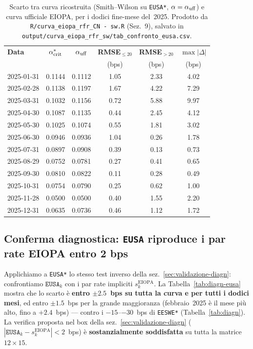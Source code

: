 \documentclass[11pt,a4paper]{article}
\theoremstyle{plain}
\theoremstyle{definition}
\theoremstyle{remark}
\begin{document}
\begin{table}[H]
\centering\small
\caption{Scarto tra curva ricostruita (Smith--Wilson su \texttt{EUSA*},
$\alpha = \alpha_{\rm uff}$) e curva ufficiale EIOPA, per i dodici fine-mese del~2025.
Prodotto da \texttt{R/curva\_eiopa\_rfr\_CN\ -\ sw.R} (Sez.~9), salvato in
\texttt{output/curva\_eiopa\_rfr\_sw/tab\_confronto\_eusa.csv}.}
\label{tab:rmse-eusa}
\renewcommand{\arraystretch}{1.2}
\begin{tabular}{lccccc}
\toprule
\textbf{Data} & $\alpha^*_{\rm crit}$ & $\alpha_{\rm uff}$ &
\textbf{RMSE}$_{\le 20}$ & \textbf{RMSE}$_{>20}$ & $\max|\Delta|$\\
 & & & (bps) & (bps) & (bps)\\
\midrule
\rowcolor{rowtint}2025-01-31 & 0.1144 & 0.1112 & 1.05 & 2.33 & 4.02\\
2025-02-28 & 0.1138 & 0.1197 & 1.67 & 4.22 & 7.29\\
\rowcolor{rowtint}2025-03-31 & 0.1032 & 0.1156 & 0.72 & 5.88 & 9.97\\
2025-04-30 & 0.1087 & 0.1135 & 0.44 & 2.45 & 4.12\\
\rowcolor{rowtint}2025-05-30 & 0.1025 & 0.1074 & 0.55 & 1.81 & 3.02\\
2025-06-30 & 0.0946 & 0.0936 & 1.04 & 0.26 & 1.78\\
\rowcolor{rowtint}2025-07-31 & 0.0897 & 0.0908 & 0.39 & 0.13 & 0.73\\
2025-08-29 & 0.0752 & 0.0781 & 0.27 & 0.41 & 0.65\\
\rowcolor{rowtint}2025-09-30 & 0.0810 & 0.0822 & 0.11 & 0.28 & 0.49\\
2025-10-31 & 0.0754 & 0.0790 & 0.25 & 0.62 & 1.00\\
\rowcolor{rowtint}2025-11-28 & 0.0500 & 0.0500 & 0.40 & 1.55 & 2.20\\
2025-12-31 & 0.0635 & 0.0736 & 0.46 & 1.12 & 1.72\\
\bottomrule
\end{tabular}
\end{table}

\subsection{Conferma diagnostica: \texttt{EUSA} riproduce i par rate EIOPA entro 2 bps}

Applichiamo a \texttt{EUSA*} lo stesso test inverso della sez.~\ref{sec:validazione-diagn}:
confrontiamo $\texttt{EUSA}_k$ con i par rate impliciti $s_k^{\text{EIOPA}}$. La
Tabella~\ref{tab:diagn-eusa} mostra che lo scarto \`e \textbf{entro $\pm 2.5$~bps su tutta
la curva e per tutti i dodici mesi}, ed entro $\pm 1.5$~bps per la grande maggioranza
(febbraio~2025 \`e il mese pi\`u alto, fino a $+2.4$~bps) --- contro i $-15$--$-30$~bps di
\texttt{EESWE*} (Tabella~\ref{tab:diagn}). La verifica proposta nel box della
sez.~\ref{sec:validazione-diagn} ($|\texttt{EUSA}_k - s_k^{\text{EIOPA}}| < 2$~bps) \`e
\textbf{sostanzialmente soddisfatta} su tutta la matrice $12 \times 15$.
\end{document}
